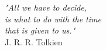 \begin{center}
    \vspace*{\fill}
    \begin{minipage}{0.6\textwidth}
        \centering %
        \textit{"All we have to decide, \\
            is what to do with the time \\
            that is given to us."} \\
        \vspace{0.5em}
        J. R. R. Tolkien
    \end{minipage}
    \vspace*{\fill}
\end{center}